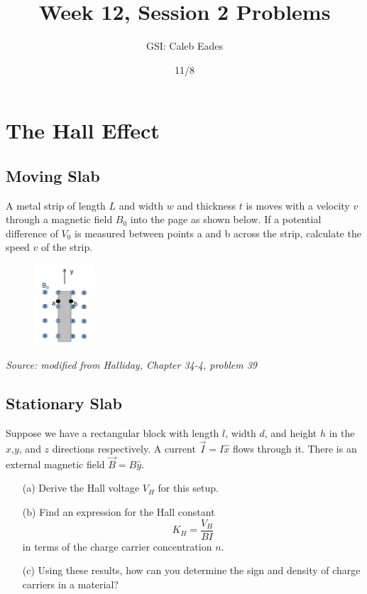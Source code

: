 \documentclass{article}
\begin{document}
\title{Week 12, Session 2 Problems}
\author{GSI: Caleb Eades}
\date{11/8}
\maketitle

\section{The Hall Effect}

\subsection{Moving Slab}

A metal strip of length $L$ and width $w$ and thickness $t$ is moves with a velocity $v$ through a magnetic field $B_0$ into the page as shown below. If a potential difference of $V_0$ is measured between points a and b across the strip, calculate the speed $v$ of the strip.

\begin{figure}[h]
	\begin{center}
	\includegraphics[width=0.2\textwidth]{Hall.png}
	\end{center}
\end{figure}

\textit{Source: modified from Halliday, Chapter 34-4, problem 39}

\subsection{Stationary Slab}

Suppose we have a rectangular block with length $l$, width $d$, and height $h$ in the $x$,$y$, and $z$ directions respectively. A current $\vec{I} = I \hat{x}$ flows through it. There is an external magnetic field $\vec{B} =  B \hat{y}$.
\begin{itemize}
	\item[(a)] Derive the Hall voltage $V_H$ for this setup.
	\item[(b)] Find an expression for the Hall constant 
	\[
	K_H = \frac{V_H}{B I}
	\]
	in terms of the charge carrier concentration $n$.
	\item[(c)] Using these results, how can you determine the sign and density of charge carriers in a material?
\end{itemize}
\end{document}
